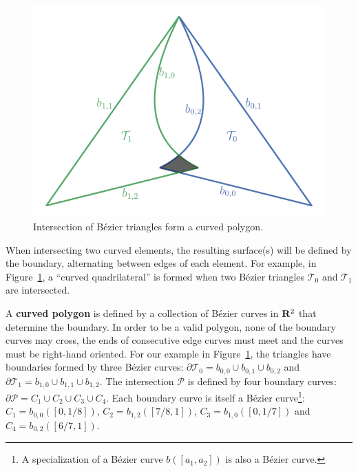 \begin{figure}
  \includegraphics{../images/curved-mesh/main_figure26.pdf}
  \centering
  \captionsetup{width=.75\linewidth}
  \caption{Intersection of B\'{e}zier triangles form a curved polygon.}
  \label{fig:bezier-triangle-intersect}
\end{figure}

When intersecting two curved elements, the resulting surface(s) will
be defined by the boundary, alternating between edges of each
element.
For example, in Figure~\ref{fig:bezier-triangle-intersect}, a
``curved quadrilateral'' is formed when two B\'{e}zier triangles
\(\mathcal{T}_0\) and \(\mathcal{T}_1\) are intersected.

A \textbf{curved polygon} is defined by a collection of B\'{e}zier curves
in \(\mathbf{R}^2\) that determine the boundary. In order to be
a valid polygon, none of the boundary curves may cross, the
ends of consecutive edge curves must meet and the curves must be right-hand
oriented. For our example in
Figure~\ref{fig:bezier-triangle-intersect}, the triangles
have boundaries formed by three B\'{e}zier curves:
\(\partial \mathcal{T}_0 = b_{0, 0} \cup b_{0, 1} \cup b_{0, 2}\) and
\(\partial \mathcal{T}_1 = b_{1, 0} \cup b_{1, 1} \cup b_{1, 2}\).
The intersection \(\mathcal{P}\) is defined by four boundary
curves: \(\partial \mathcal{P} =
C_1 \cup C_2 \cup C_3 \cup C_4\). Each boundary
curve is itself a B\'{e}zier curve\footnote{A specialization of a
B\'{e}zier curve \(b\left(\left[a_1, a_2\right]\right)\)
is also a B\'{e}zier curve.}:
\(C_1 = b_{0, 0}\left(\left[0, 1/8\right]\right)\),
\(C_2 = b_{1, 2}\left(\left[7/8, 1\right]\right)\),
\(C_3 = b_{1, 0}\left(\left[0, 1/7\right]\right)\) and
\(C_4 = b_{0, 2}\left(\left[6/7, 1\right]\right)\).

